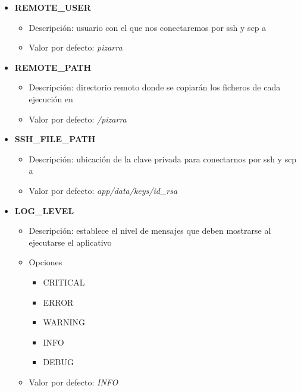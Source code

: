 \documentclass[11pt,spanish,listoffigures,listoftables]{tfgetsinf}
\begin{document}
\begin{itemize}
	\item \textbf{REMOTE\_USER}
	\begin{itemize}
		\item Descripción: usuario con el que nos conectaremos por \acrshort{ssh} y \acrshort{scp} a \kahan
		\item Valor por defecto: \textit{pizarra}
	\end{itemize}
\end{itemize}

\begin{itemize}
	\item \textbf{REMOTE\_PATH}
	\begin{itemize}
		\item Descripción: directorio remoto donde se copiarán los ficheros de cada ejecución en \kahan
		\item Valor por defecto: \textit{/pizarra}
	\end{itemize}
\end{itemize}

\begin{itemize}
	\item \textbf{SSH\_FILE\_PATH}
	\begin{itemize}
		\item Descripción: ubicación de la clave privada para conectarnos por \acrshort{ssh} y \acrshort{scp} a \kahan
		\item Valor por defecto: \textit{app/data/keys/id\_rsa}
	\end{itemize}
\end{itemize}

\begin{itemize}
	\item \textbf{LOG\_LEVEL}
	\begin{itemize}
		\item Descripción: establece el nivel de mensajes que deben mostrarse al ejecutarse el aplicativo
		\item Opciones
		\begin{itemize}
			\item CRITICAL
			\item ERROR
			\item WARNING
			\item INFO
			\item DEBUG
		\end{itemize}
		\item Valor por defecto: \textit{INFO}
	\end{itemize}
\end{itemize}
\end{document}
